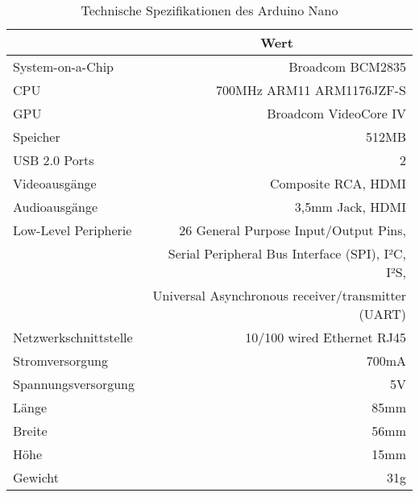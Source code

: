 \begin{table}[ht]
\caption{Technische Spezifikationen des Arduino Nano}
\begin{center}
\begin{tabular}{|l|r|}
\hline
\rowcolor{lightgray} \multicolumn{1}{|c|}{\textbf{Spezifikation}} & \multicolumn{1}{|c|}{\textbf{Wert}}\\
\hline
System-on-a-Chip & Broadcom BCM2835\\
\hline
CPU & 700MHz ARM11 ARM1176JZF-S\\
\hline
GPU & Broadcom VideoCore IV\\
\hline
Speicher & 512MB\\
\hline
USB 2.0 Ports & 2\\
\hline
Videoausgänge & Composite RCA, HDMI\\
\hline
Audioausgänge & 3,5mm Jack, HDMI\\
\hline
Low-Level Peripherie & 26 General Purpose Input/Output Pins,\\
& Serial Peripheral Bus Interface (SPI), I²C, I²S,\\
& Universal Asynchronous receiver/transmitter (UART)\\
\hline
Netzwerkschnittstelle & 10/100 wired Ethernet RJ45\\
\hline
Stromversorgung & 700mA\\
\hline
Spannungsversorgung & 5V\\
\hline
Länge & 85mm\\
\hline
Breite & 56mm\\
\hline
Höhe & 15mm\\
\hline
Gewicht & 31g\\
\hline
\end{tabular}
\end{center}
\label{tab:raspberry}
\end{table}

\clearpage{}